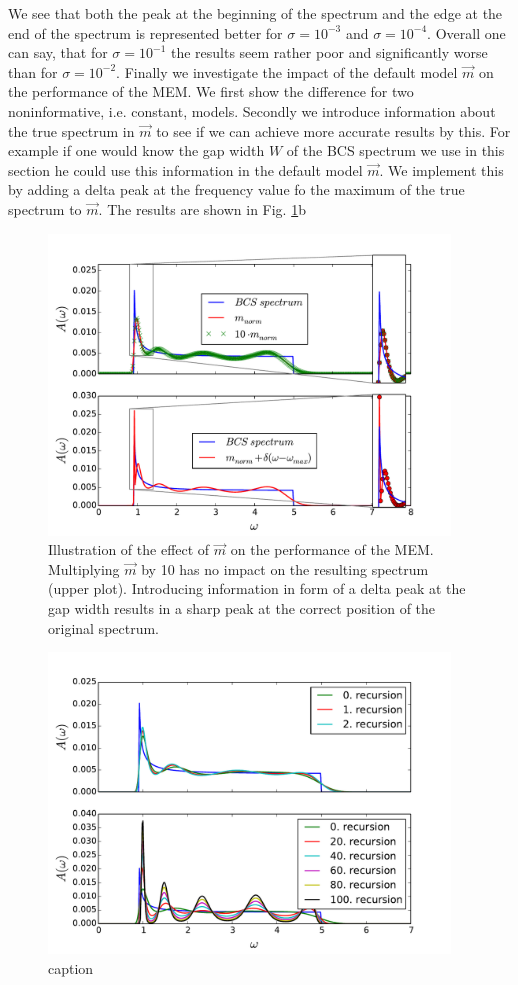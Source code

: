 \FloatBarrier
We see that both the peak at the beginning of the spectrum and the edge at the end of the spectrum is represented better for $\sigma = 10^{-3}$ and $\sigma = 10^{-4}$. Overall one can say, that for $\sigma = 10^{-1}$ the results seem rather poor and significantly worse than for $\sigma = 10^{-2}$.\newline
Finally we investigate the impact of the default model $\vec m$ on the performance of the MEM. We first show the difference for two noninformative, i.e. constant, models.
Secondly we introduce information about the true spectrum in $\vec m$ to see if we can achieve more accurate results by this. For example if one would know the gap width $W$ of the BCS spectrum we use in this section he could use this information in the default model $\vec m$. We implement this by adding a delta peak at the frequency value fo the maximum of the true spectrum to $\vec m$. The results are shown in Fig. \ref{results:fig_6}b
\begin{figure}[htbp]
	\centering
	\includegraphics[width=0.95\textwidth]{./images/BCS_delta_peak_example.pdf}
	\caption{Illustration of the effect of $\vec m$ on the performance of the MEM. Multiplying $\vec m$ by 10 has no impact on the resulting spectrum (upper plot). Introducing information in form of a delta peak at the gap width results in a sharp peak at the correct position of the original spectrum.}
	\label{results:fig_6}
\end{figure}
\FloatBarrier

\begin{figure}[htbp]
	\centering
	\includegraphics[width=0.95\textwidth]{./images/BCS_annealing_example.pdf}
	\caption{caption}
	\label{results:fig_7}
\end{figure}
\FloatBarrier